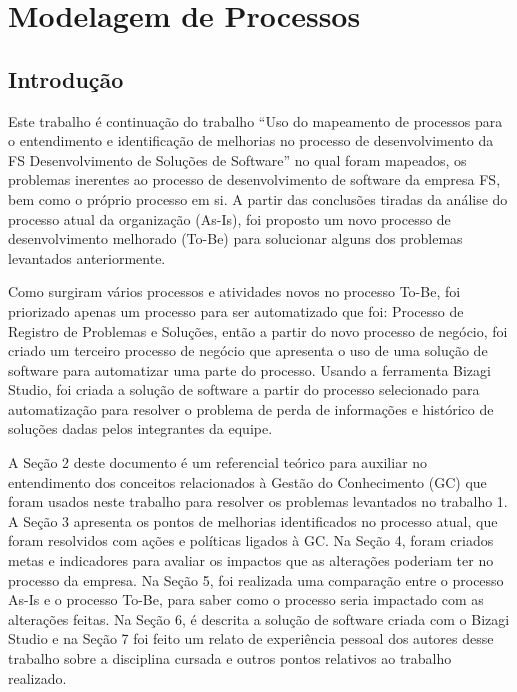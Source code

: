 \chapter[Modelagem de Processos]{Modelagem de Processos}

\section{Introdução} 

Este trabalho é continuação do trabalho “Uso do mapeamento de processos para o entendimento e identificação de melhorias no processo de desenvolvimento da FS Desenvolvimento de Soluções de Software” no qual foram mapeados, os problemas inerentes ao processo de desenvolvimento de software da empresa FS, bem como o próprio processo em si. A partir das conclusões tiradas da análise do processo atual da organização (As-Is), foi proposto um novo processo de desenvolvimento melhorado (To-Be) para solucionar alguns dos problemas levantados anteriormente.

Como surgiram vários processos e atividades novos no processo To-Be, foi priorizado apenas um processo para ser automatizado que foi: Processo de Registro de Problemas e Soluções, então a partir do novo processo de negócio, foi criado um terceiro processo de negócio que apresenta o uso de uma solução de software para automatizar uma parte do processo. Usando a ferramenta Bizagi Studio, foi criada a solução de software a partir do processo selecionado para automatização para resolver o problema de perda de informações e histórico de soluções dadas pelos integrantes da equipe.

A Seção 2 deste documento é um referencial teórico para auxiliar no entendimento dos conceitos relacionados à Gestão do Conhecimento (GC) que foram usados neste trabalho para resolver os problemas levantados no trabalho 1. A Seção 3 apresenta os pontos de melhorias identificados no processo atual, que foram resolvidos com ações e políticas ligados à GC. Na Seção 4, foram criados metas e indicadores para avaliar os impactos que as alterações poderiam ter no processo da empresa. Na Seção 5, foi realizada uma comparação entre o processo As-Is e o processo To-Be, para saber como o processo seria impactado com as alterações feitas. Na Seção 6, é descrita a solução de software criada com o Bizagi Studio e na Seção 7 foi feito um relato de experiência pessoal dos autores desse trabalho sobre a disciplina cursada e outros pontos relativos ao trabalho realizado.

